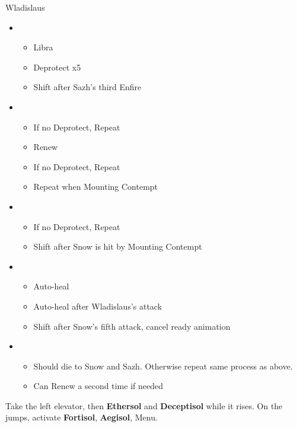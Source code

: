 	\begin{battle}[0:45]{Wladislaus}
		\begin{itemize}
			\item \third
			      \begin{itemize}
				      \item Libra
				      \item Deprotect x5
				      \item Shift after Sazh's third Enfire
			      \end{itemize}
			\item \second
			      \begin{itemize}
				      \item If no Deprotect, Repeat
				      \item Renew
					  \item If no Deprotect, Repeat
				      \item Repeat when Mounting Contempt
			      \end{itemize}
			\item \third
			      \begin{itemize}
				      \item If no Deprotect, Repeat
				      \item Shift after Snow is hit by Mounting Contempt
			      \end{itemize}
			\item \first
			      \begin{itemize}
				      \item Auto-heal
				      \item Auto-heal after Wladislaus's attack
				      \item Shift after Snow's fifth attack, cancel ready animation
			      \end{itemize}
			\item \second
			      \begin{itemize}
				      \item Should die to Snow and Sazh. Otherwise repeat same process as above.
				      \item Can Renew a second time if needed
			      \end{itemize}
		\end{itemize}
	\end{battle}
	Take the left elevator, then \textbf{Ethersol} and \textbf{Deceptisol} while it rises. On the jumps, activate \textbf{Fortisol}, \textbf{Aegisol}, Menu.
